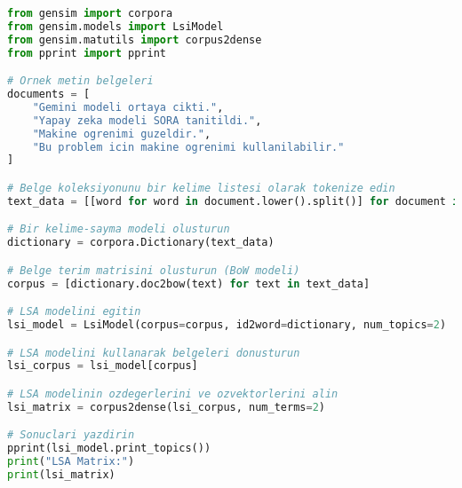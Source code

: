 \begin{lstlisting}[language=Python]
from gensim import corpora
from gensim.models import LsiModel
from gensim.matutils import corpus2dense
from pprint import pprint

# Ornek metin belgeleri
documents = [
    "Gemini modeli ortaya cikti.",
    "Yapay zeka modeli SORA tanitildi.",
    "Makine ogrenimi guzeldir.",
    "Bu problem icin makine ogrenimi kullanilabilir."
]

# Belge koleksiyonunu bir kelime listesi olarak tokenize edin
text_data = [[word for word in document.lower().split()] for document in documents]

# Bir kelime-sayma modeli olusturun
dictionary = corpora.Dictionary(text_data)

# Belge terim matrisini olusturun (BoW modeli)
corpus = [dictionary.doc2bow(text) for text in text_data]

# LSA modelini egitin
lsi_model = LsiModel(corpus=corpus, id2word=dictionary, num_topics=2)

# LSA modelini kullanarak belgeleri donusturun
lsi_corpus = lsi_model[corpus]

# LSA modelinin ozdegerlerini ve ozvektorlerini alin
lsi_matrix = corpus2dense(lsi_corpus, num_terms=2)

# Sonuclari yazdirin
pprint(lsi_model.print_topics())
print("LSA Matrix:")
print(lsi_matrix)
\end{lstlisting}

\newpage
